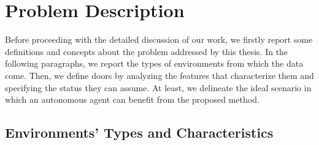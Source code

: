 \section{Problem Description}

Before proceeding with the detailed discussion of our work, we firstly report some definitions and concepts about the problem addressed by this thesis. In the following paragraphs, we report the types of environments from which the data come. Then, we define doors by analyzing the features that characterize them and specifying the status they can assume. At least, we delineate the ideal scenario in which an autonomous agent can benefit from the proposed method.

\subsection{Environments' Types and Characteristics}
